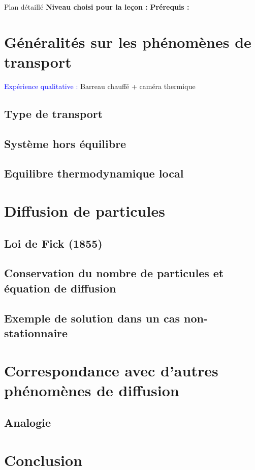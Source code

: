 \begin{reportBlock}{Plan détaillé}
  \textbf{Niveau choisi pour la leçon :} 
  \newline
  \textbf{Prérequis : }
  \newline


\section{Généralités sur les phénomènes de transport}

\textcolor{blue}{Expérience qualitative :} Barreau  chauffé + caméra thermique
\subsection{Type de transport}
\subsection{Système hors équilibre}
\subsection{Equilibre thermodynamique local}

\section{Diffusion de particules}

\subsection{Loi de Fick (1855)}
\subsection{Conservation du nombre de particules et équation de diffusion}
\subsection{Exemple de solution dans un cas non-stationnaire}

\section{Correspondance avec d'autres phénomènes de diffusion}

\subsection{Analogie}


\section*{Conclusion}

\end{reportBlock}